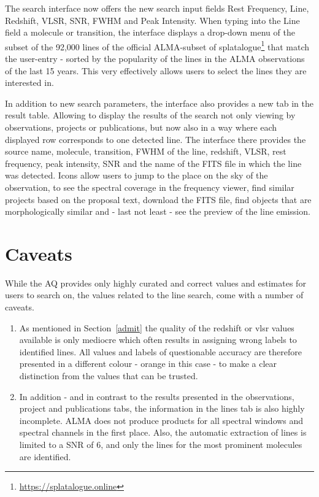 \documentclass[11pt,twoside]{article}
\begin{document}
The search interface now offers the new search input fields Rest Frequency, Line, Redshift, VLSR, SNR, FWHM and Peak Intensity. When typing into the Line field a molecule or transition, the interface displays a drop-down menu of the subset of the 92,000 lines of the official ALMA-subset of splatalogue\footnote{\url{https://splatalogue.online}} that match the user-entry - sorted by the popularity of the lines in the ALMA observations of the last 15 years. This very effectively allows users to select the lines they are interested in.

In addition to new search parameters, the interface also provides a new tab in the result table. Allowing to display the results of the search not only viewing by observations, projects or publications, but now also in a way where each displayed row corresponds to one detected line. The interface there provides the source name, molecule, transition, FWHM of the line, redshift, VLSR, rest frequency, peak intensity, SNR and the name of the FITS file in which the line was detected. Icons allow users to jump to the place on the sky of the observation, to see the spectral coverage in the frequency viewer, find similar projects based on the proposal text, download the FITS file, find objects that are morphologically similar and - last not least - see the preview of the line emission.

\section{Caveats}
While the AQ provides only highly curated and correct values and estimates for users to search on, the values related to the line search, come with a number of caveats.

\begin{enumerate}
\item As mentioned in Section~\ref{admit} the quality of the redshift or vlsr values available is only mediocre which often results in assigning wrong labels to identified lines. All values and labels of questionable accuracy are therefore presented in a different colour - orange in this case - to make a clear distinction from the values that can be trusted.
\item In addition - and in contrast to the results presented in the observations, project and publications tabs, the information in the lines tab is also highly incomplete. ALMA does not produce products for all spectral windows and spectral channels in the first place. Also, the automatic extraction of lines is limited to a SNR of 6, and only the lines for the most prominent molecules are identified.
\end{enumerate}
\end{document}
